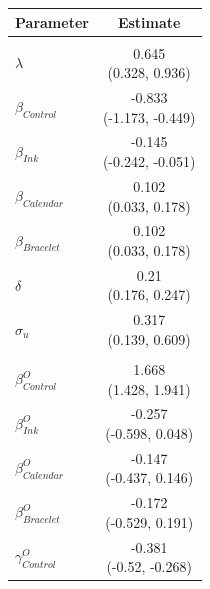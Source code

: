 
\begin{tabular}[t]{lc}
\toprule
Parameter & Estimate\\
\midrule
\addlinespace[0.3em]
\multicolumn{2}{l}{\textbf{Take-up}}\\
\hspace{1em}\(\lambda\) & \makecell[c]{0.645\\(0.328, 0.936)}\\
\hspace{1em}\(\beta_{Control}\) & \makecell[c]{-0.833\\(-1.173, -0.449)}\\
\hspace{1em}\(\beta_{Ink}\) & \makecell[c]{-0.145\\(-0.242, -0.051)}\\
\hspace{1em}\(\beta_{Calendar}\) & \makecell[c]{0.102\\(0.033, 0.178)}\\
\hspace{1em}\(\beta_{Bracelet}\) & \makecell[c]{0.102\\(0.033, 0.178)}\\
\hspace{1em}\(\delta\) & \makecell[c]{0.21\\(0.176, 0.247)}\\
\hspace{1em}\(\sigma_u\) & \makecell[c]{0.317\\(0.139, 0.609)}\\
\addlinespace[0.3em]
\multicolumn{2}{l}{\textbf{Observability}}\\
\hspace{1em}\(\beta^O_{Control}\) & \makecell[c]{1.668\\(1.428, 1.941)}\\
\hspace{1em}\(\beta^O_{Ink}\) & \makecell[c]{-0.257\\(-0.598, 0.048)}\\
\hspace{1em}\(\beta^O_{Calendar}\) & \makecell[c]{-0.147\\(-0.437, 0.146)}\\
\hspace{1em}\(\beta^O_{Bracelet}\) & \makecell[c]{-0.172\\(-0.529, 0.191)}\\
\hspace{1em}\(\gamma^O_{Control}\) & \makecell[c]{-0.381\\(-0.52, -0.268)}\\

\end{tabular}
